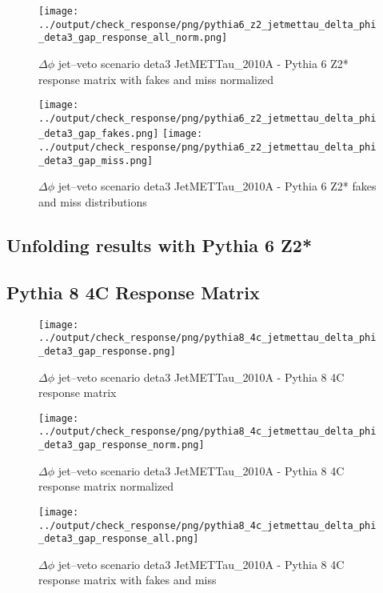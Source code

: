 \documentclass[11pt]{book}
\begin{document}
\begin{figure}[ht]
\centering
\texttt{[image: ../output/check\_response/png/pythia6\_z2\_jetmettau\_delta\_phi\_deta3\_gap\_response\_all\_norm.png]}
\caption{$\Delta\phi$ jet--veto scenario deta3 JetMETTau\_2010A - Pythia 6 Z2* response matrix with fakes and miss normalized}
\label{p6_jetmettau_delta_phi_deta3_gap_response_all_norm}
\end{figure}

\begin{figure}[ht]
\centering
\texttt{[image: ../output/check\_response/png/pythia6\_z2\_jetmettau\_delta\_phi\_deta3\_gap\_fakes.png]}
\texttt{[image: ../output/check\_response/png/pythia6\_z2\_jetmettau\_delta\_phi\_deta3\_gap\_miss.png]}
\caption{$\Delta\phi$ jet--veto scenario deta3 JetMETTau\_2010A - Pythia 6 Z2* fakes and miss distributions}
\label{p6_jetmettau_delta_phi_deta3_gap_fakesmiss}
\end{figure}


\clearpage
\subsection{Unfolding results with Pythia 6 Z2*}


\clearpage
\subsection{Pythia 8 4C Response Matrix}


\begin{figure}[ht]
\centering
\texttt{[image: ../output/check\_response/png/pythia8\_4c\_jetmettau\_delta\_phi\_deta3\_gap\_response.png]}
\caption{$\Delta\phi$ jet--veto scenario deta3 JetMETTau\_2010A - Pythia 8 4C response matrix}
\label{p8_jetmettau_delta_phi_deta3_gap_response}
\end{figure}

\begin{figure}[ht]
\centering
\texttt{[image: ../output/check\_response/png/pythia8\_4c\_jetmettau\_delta\_phi\_deta3\_gap\_response\_norm.png]}
\caption{$\Delta\phi$ jet--veto scenario deta3 JetMETTau\_2010A - Pythia 8 4C response matrix normalized}
\label{p8_jetmettau_delta_phi_deta3_gap_response_norm}
\end{figure}

\begin{figure}[ht]
\centering
\texttt{[image: ../output/check\_response/png/pythia8\_4c\_jetmettau\_delta\_phi\_deta3\_gap\_response\_all.png]}
\caption{$\Delta\phi$ jet--veto scenario deta3 JetMETTau\_2010A - Pythia 8 4C response matrix with fakes and miss}
\label{p8_jetmettau_delta_phi_deta3_gap_response_all}
\end{figure}
\end{document}
